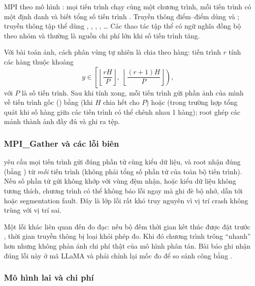 MPI theo mô hình : mọi tiến trình chạy cùng
một chương trình, mỗi tiến trình có một định danh  và biết tổng số
tiến trình . Truyền thông điểm--điểm dùng  và
; truyền thông tập thể dùng , ,
, , \ldots{} Các thao tác tập thể có ngữ nghĩa
đồng bộ theo nhóm và thường là nguồn chi phí lớn khi số tiến trình tăng.

Với bài toán ảnh, cách phân vùng tự nhiên là chia theo hàng: tiến trình $r$ tính
các hàng thuộc khoảng
\begin{equation}
  y \in \left[\left\lfloor \frac{rH}{P}\right\rfloor,\;
             \left\lfloor \frac{(r+1)H}{P}\right\rfloor\right),
\end{equation}
với $P$ là số tiến trình. Sau khi tính xong, mỗi tiến trình gửi phần ảnh của mình
về tiến trình gốc () bằng  (khi $H$ chia hết cho $P$)
hoặc  (trong trường hợp tổng quát khi số hàng giữa các tiến
trình có thể chênh nhau 1 hàng); root ghép các mảnh thành ảnh đầy đủ và ghi ra
tệp.

\subsubsection{MPI\_Gather và các lỗi biên}

 yêu cầu mọi tiến trình gửi đúng  phần tử cùng
kiểu dữ liệu, và root nhận đúng  (bằng ) từ
\emph{mỗi} tiến trình (không phải tổng số phần tử của toàn bộ tiến trình). Nếu số
phần tử gửi không khớp với vùng đệm nhận, hoặc kiểu dữ liệu không tương thích,
chương trình có thể không báo lỗi ngay mà ghi đè bộ nhớ, dẫn tới
 hoặc segmentation fault. Đây là lớp lỗi rất khó
truy nguyên vì vị trí crash không trùng với vị trí sai.

Một lỗi khác liên quan đến đo đạc: nếu bộ đếm thời gian kết thúc được đặt trước
, thời gian truyền thông bị loại khỏi phép đo. Khi đó chương
trình trông “nhanh” hơn nhưng không phản ánh chi phí thật của mô hình phân tán.
Bài báo ghi nhận đúng lỗi này ở mã LLaMA và phải chỉnh lại mốc đo để so sánh công
bằng \cite{diehl2026}.

\subsubsection{Mô hình lai và chi phí}

